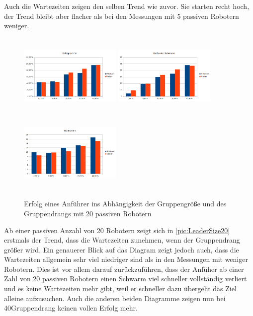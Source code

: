 Auch die Wartezeiten zeigen den selben Trend wie zuvor. Sie starten recht hoch, der Trend bleibt aber flacher als bei den Messungen mit 5 passiven Robotern weniger.

\begin{figure}
	\includegraphics[width=4.9cm, height=4cm]{graphics/Statistics/Leader/FlockSize/20_1.png}
	\includegraphics[width=4.9cm, height=4cm]{graphics/Statistics/Leader/FlockSize/20_2.png}
	\includegraphics[width=4.9cm, height=4cm]{graphics/Statistics/Leader/FlockSize/20_3.png}
	\caption{Erfolg eines Anführer ins Abhängigkeit der Gruppengröße und des Gruppendrangs mit 20 passiven Robotern}
	\label{pic:LeaderSize20}
\end{figure}

Ab einer passiven Anzahl von 20 Robotern zeigt sich in \autoref{pic:LeaderSize20} erstmals der Trend, dass die Wartezeiten zunehmen, wenn der Gruppendrang größer wird. Ein genauerer Blick auf das Diagram zeigt jedoch auch, dass die Wartezeiten allgemein sehr viel niedriger sind als in den Messungen mit weniger Robotern. Dies ist vor allem darauf zurückzuführen, dass der Anfüher ab einer Zahl von 20 passiven Robotern einen Schwarm viel schneller vollständig verliert und es keine Wartezeiten mehr gibt, weil er schneller dazu übergeht das Ziel alleine aufzusuchen. Auch die anderen beiden Diagramme zeigen nun bei 40\per Gruppendrang keinen vollen Erfolg mehr.


